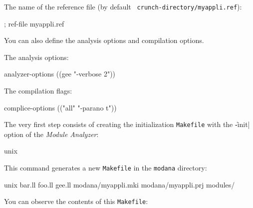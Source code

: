 The name of the reference file (by default {\tt
crunch-directory/myappli.ref}):
\begin{Code*}
        ; ref-file myappli.ref
\end{Code*}

You can also define the analysis options and compilation options.

The analysis options:
\begin{Code*}
        analyzer-options ((gee "-verbose 2"))
\end{Code*}

The compilation flags:
\begin{Code*}
        complice-options (("all" "-parano t"))
\end{Code*}

The very first step consists of creating the initialization {\tt Makefile} with the \|-init| option of the {\em Module Analyzer}:
\begin{Code*}
unix%
\end{Code*}
This command generates a new {\tt Makefile} in the {\tt modana} directory:
\begin{Longcode*}
unix%
bar.ll
foo.ll
gee.ll
modana/myappli.mki
modana/myappli.prj
modules/
\end{Longcode*}
You can observe the contents of this {\tt Makefile}:
